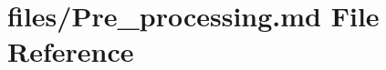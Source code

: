 \hypertarget{Pre__processing_8md}{}\section{files/\+Pre\+\_\+processing.md File Reference}
\label{Pre__processing_8md}
